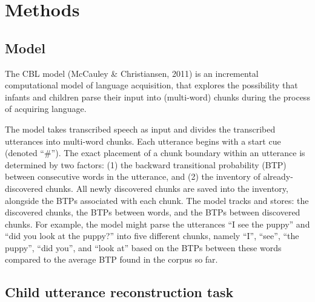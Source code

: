 \documentclass[
  english,
  man,mask,floatsintext]{apa6}
\begin{document}
\hypertarget{methods}{%
\section{Methods}\label{methods}}

\hypertarget{model}{%
\subsection{Model}\label{model}}

The CBL model (McCauley \& Christiansen, 2011) is an incremental computational model of language acquisition, that explores the possibility that infants and children parse their input into (multi-word) chunks during the process of acquiring language.

The model takes transcribed speech as input and divides the transcribed utterances into multi-word chunks. Each utterance begins with a start cue (denoted \enquote{\#}). The exact placement of a chunk boundary within an utterance is determined by two factors: (1) the backward transitional probability (BTP) between consecutive words in the utterance, and (2) the inventory of already-discovered chunks. All newly discovered chunks are saved into the inventory, alongside the BTPs associated with each chunk. The model tracks and stores: the discovered chunks, the BTPs between words, and the BTPs between discovered chunks. For example, the model might parse the utterances \enquote{I see the puppy} and \enquote{did you look at the puppy?} into five different chunks, namely \enquote{I}, \enquote{see}, \enquote{the puppy}, \enquote{did you}, and \enquote{look at} based on the BTPs between these words compared to the average BTP found in the corpus so far.

\hypertarget{child-utterance-reconstruction-task}{%
\subsection{Child utterance reconstruction task}\label{child-utterance-reconstruction-task}}
\end{document}

